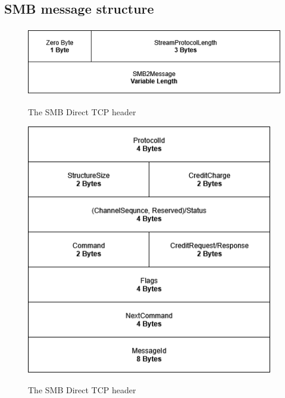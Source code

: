 \documentclass[english, 12pt, a4paper, elec, utf8, a-2b, online]{aaltothesis}
\begin{document}
\subsection{SMB message structure}

\begin{figure}[h]
	\centering
	\includegraphics[alt={A block diagram of the SMB Direct TCP header format, detailing its fields and their sizes.}, height=3cm]{./images/smb_tcp_direct_header.drawio.png}
	\caption{The SMB Direct TCP header}
	\label{fig:direct_tcp_header}
\end{figure}

\begin{figure}[h]
	\centering
	\includegraphics[alt={A block diagram of the SMB2 Packet header common fields format, detailing its fields and their sizes.}, height=11cm]{./images/smb_packet_header_common.png}
	\caption{The SMB Direct TCP header}
	\label{fig:smb2_transport_header}
\end{figure}
\end{document}
